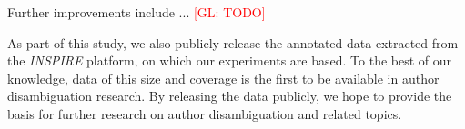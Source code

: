 \documentclass{article}
\newcommand{\glnote}[1]{\textcolor{red}{[GL: #1]}}
\begin{document}
Further improvements include ... \glnote{TODO}

As part of this study, we also publicly release the annotated data extracted
from the \emph{INSPIRE} platform, on which our experiments are based.
To the best of our knowledge, data of this size and coverage is the first to be
available in author disambiguation research. By releasing the data publicly,
we hope to provide the basis for further research on author disambiguation
and related topics.








\end{document}
